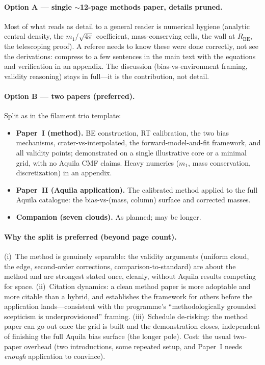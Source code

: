 \documentclass[11pt,a4paper]{article}
\newcommand{\Rbe}{R_{\mathrm{BE}}}
\begin{document}
\paragraph{Option A --- single $\sim$12-page methods paper, details pruned.}
Most of what reads as detail to a general reader is numerical hygiene
(analytic central density, the $m_{1}/\sqrt{4\pi}$ coefficient,
mass-conserving cells, the wall at $\Rbe$, the telescoping proof). A referee
needs to know these were done correctly, not see the derivations: compress
to a few sentences in the main text with the equations and verification in
an appendix. The discussion (bias-vs-environment framing, validity
reasoning) stays in full---it is the contribution, not detail.

\paragraph{Option B --- two papers (preferred).} Split as in the filament
trio template:
\begin{itemize}
  \item \textbf{Paper~I (method).} BE construction, RT calibration, the two
        bias mechanisms, crater-vs-interpolated, the forward-model-and-fit
        framework, and all validity points; demonstrated on a single
        illustrative core or a minimal grid, with no Aquila CMF claims.
        Heavy numerics ($m_{1}$, mass conservation, discretization) in an
        appendix.
  \item \textbf{Paper~II (Aquila application).} The calibrated method
        applied to the full Aquila catalogue: the bias-vs-(mass, column)
        surface and corrected masses.
  \item \textbf{Companion (seven clouds).} As planned; may be longer.
\end{itemize}

\paragraph{Why the split is preferred (beyond page count).}
(i)~The method is genuinely separable: the validity arguments (uniform
cloud, the edge, second-order corrections, comparison-to-standard) are about
the method and are strongest stated once, cleanly, without Aquila results
competing for space. (ii)~Citation dynamics: a clean method paper is more
adoptable and more citable than a hybrid, and establishes the framework for
others before the application lands---consistent with the programme's
``methodologically grounded scepticism is underprovisioned'' framing.
(iii)~Schedule de-risking: the method paper can go out once the grid is
built and the demonstration closes, independent of finishing the full Aquila
bias surface (the longer pole). Cost: the usual two-paper overhead (two
introductions, some repeated setup, and Paper~I needs \emph{enough}
application to convince).
\end{document}
